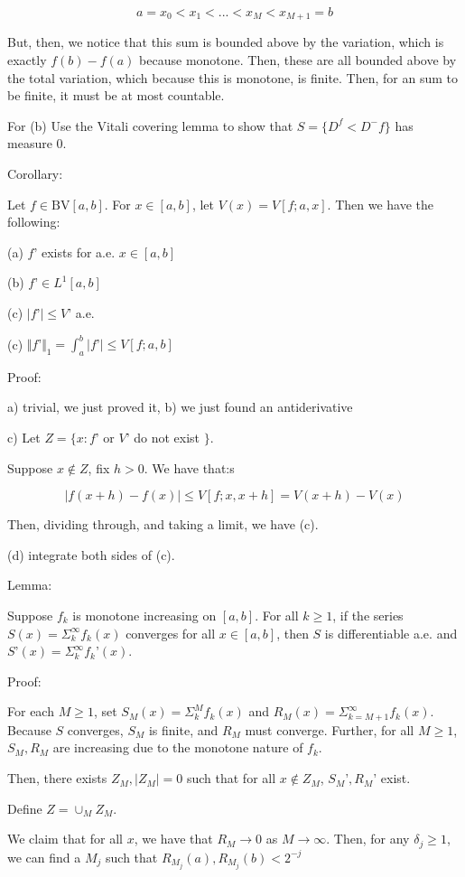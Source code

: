 \documentclass[10pt]{article}
\newcommand{\bv}{{\text{BV}}}
\begin{document}
$$a = x_0 < x_1 < ... < x_M < x_{M+1} = b$$

But, then, we notice that this sum is bounded above by the variation, which is exactly $f(b) - f(a)$ because monotone. Then, these are all bounded above by the total variation, which because this is monotone, is finite. Then, for an sum to be finite, it must be at most countable.

For (b) Use the Vitali covering lemma to show that $S = \{ D^f < D^- f \}$ has measure 0.

Corollary:

Let $f \in \bv[a,b]$. For $x \in [a,b]$, let $V(x) = V[f;a,x]$. Then we have the following:

(a) $f’$ exists for a.e. $x \in [a,b]$

(b) $f’ \in L^1[a,b]$

(c) $|f’| \leq V’$ a.e.

(c) $\Vert f’ \Vert_1 = \int_a^b |f’| \leq V[f;a,b]$

Proof:

a) trivial, we just proved it, b) we just found an antiderivative

c) Let $Z = \{ x : f’$ or $V’$ do not exist $\}$.

Suppose $x \not \in Z$, fix $h > 0$. We have that:s

$$ | f(x+h) - f(x) | \leq V[f;x,x+h] = V(x+h) - V(x)$$

Then, dividing through, and taking a limit, we have (c).

(d) integrate both sides of (c).

Lemma:

Suppose $f_k$ is monotone increasing on $[a,b]$. For all $k \geq 1$, if the series $S(x) = \Sigma_k^\infty f_k(x)$ converges for all $x \in [a,b]$, then $S$ is differentiable a.e. and $S’(x) = \Sigma_k^\infty f_k’(x)$.

Proof:

For each $M \geq 1$, set $S_{M}(x) = \Sigma_k^M f_k(x)$ and $R_M(x) = \Sigma_{k = M+1}^\infty f_k(x)$. Because $S$ converges, $S_M$ is finite, and $R_M$ must converge. Further, for all $M \geq 1$, $S_M, R_M$ are increasing due to the monotone nature of $f_k$.

Then, there exists $Z_M, |Z_M| = 0$ such that for all $x \not \in Z_M$, $S_M’, R_M’$ exist.

Define $Z = \cup_M Z_M$.

We claim that for all $x$, we have that $R_M \to 0$ as $M \to \infty$. Then, for any $\delta_j \geq 1$, we can find a $M_j$ such that $R_{M_j}(a), R_{M_j}(b) < 2^{-j}$
\end{document}
